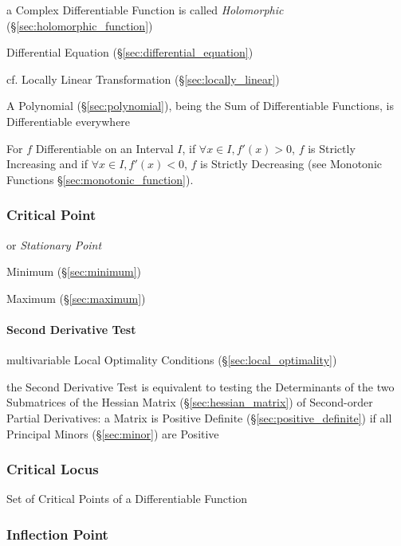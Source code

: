 a Complex Differentiable Function is called \emph{Holomorphic}
(\S\ref{sec:holomorphic_function})

\fist Differential Equation (\S\ref{sec:differential_equation})

\fist cf. Locally Linear Transformation (\S\ref{sec:locally_linear})

A Polynomial (\S\ref{sec:polynomial}), being the Sum of Differentiable
Functions, is Differentiable everywhere

For $f$ Differentiable on an Interval $I$, if $\forall x \in I, f'(x)
> 0$, $f$ is Strictly Increasing and if $\forall x \in I, f'(x) < 0$,
$f$ is Strictly Decreasing (see Monotonic Functions
\S\ref{sec:monotonic_function}).



\subsubsection{Critical Point}\label{sec:critical_point}

or \emph{Stationary Point}

Minimum (\S\ref{sec:minimum})

Maximum (\S\ref{sec:maximum})



\paragraph{Second Derivative Test}\label{sec:second_derivative_test}\hfill

\fist multivariable Local Optimality Conditions (\S\ref{sec:local_optimality})

the Second Derivative Test is equivalent to testing the Determinants of the two
Submatrices of the Hessian Matrix (\S\ref{sec:hessian_matrix}) of Second-order
Partial Derivatives: a Matrix is Positive Definite
(\S\ref{sec:positive_definite}) if all Principal Minors (\S\ref{sec:minor}) are
Positive



\subsubsection{Critical Locus}\label{sec:critical_locus}

Set of Critical Points of a Differentiable Function



\subsubsection{Inflection Point}\label{sec:inflection_point}

